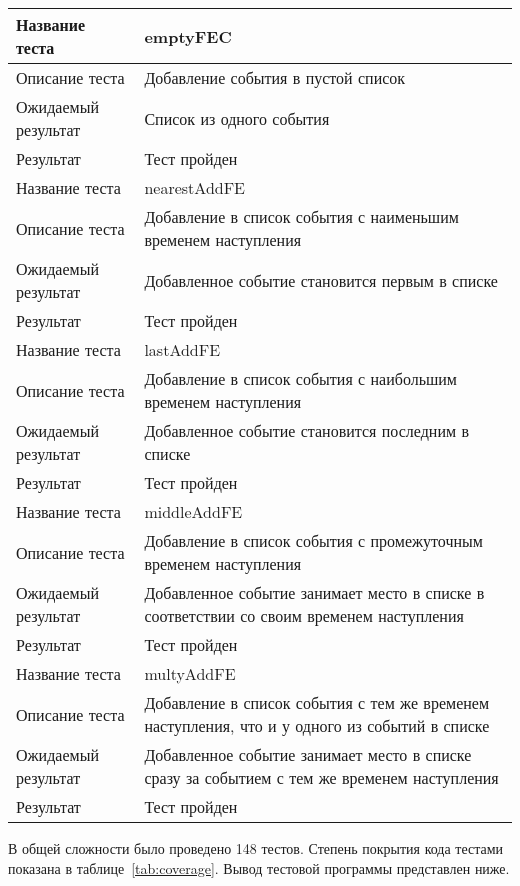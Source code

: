 \begin{table}[h!]
\caption{}
\label{tab:chainsTest}
\begin{tabular}{|l|p{}|}
\hline
Название теста & emptyFEC\\
\hline
Описание теста & Добавление события в пустой список\\
\hline
Ожидаемый результат & Список из одного события\\
\hline
Результат & Тест пройден\\
\hline
\hline
Название теста & nearestAddFE\\
\hline
Описание теста & Добавление в список события с наименьшим временем наступления\\
\hline
Ожидаемый результат & Добавленное событие становится первым в списке\\
\hline
Результат & Тест пройден\\
\hline
\hline
Название теста & lastAddFE\\
\hline
Описание теста & Добавление в список события с наибольшим временем наступления\\
\hline
Ожидаемый результат & Добавленное событие становится последним в списке\\
\hline
Результат & Тест пройден\\
\hline
\hline
Название теста & middleAddFE\\
\hline
Описание теста & Добавление в список события с промежуточным временем наступления\\
\hline
Ожидаемый результат & Добавленное событие занимает место в списке в соответствии со своим временем наступления\\
\hline
Результат & Тест пройден\\
\hline
\hline
Название теста & multyAddFE\\
\hline
Описание теста & Добавление в список события с тем же  временем наступления, что и у  одного из событий в списке\\
\hline
Ожидаемый результат & Добавленное событие занимает место в списке сразу за событием с тем же временем наступления\\
\hline
Результат & Тест пройден \\
\hline
\end{tabular}
\end{table}

В общей сложности было проведено 148 тестов. Степень покрытия кода тестами показана в таблице~\ref{tab:coverage}. Вывод тестовой программы представлен ниже.


